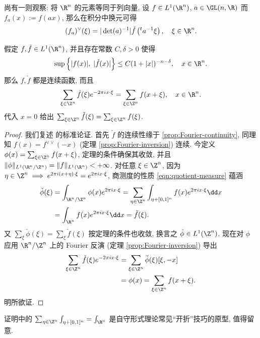 尚有一则观察: 将 $\R^n$ 的元素等同于列向量, 设 $f \in L^1(\R^n)$, $a \in \GL(n, \R)$ 而 $f_a(x) := f(ax)$, 那么在积分中换元可得
\begin{equation}\label{eqn:Fourier-dilation}
	(f_a)^\vee(\xi) = |\det(a)^{-1}| \check{f}\left({}^t a^{-1}\xi\right), \quad \xi \in \R^n.
\end{equation}

\begin{theorem}\label{prop:Poisson-sum} 
	假定 $f, \check{f} \in L^1(\R^n)$, 并且存在常数 $C, \delta > 0$ 使得
	\[ \sup\left\{ |f(x)|, \; |\check{f}(x)| \right\} \leq C(1 + |x|)^{-n-\delta}, \quad x \in \R^n. \]
	那么 $f, \check{f}$ 都是连续函数, 而且
	\[ \sum_{\xi \in \Z^n} \check{f}(\xi) e^{-2\pi ix \cdot \xi} = \sum_{\xi \in \Z^n} f(x + \xi), \quad x \in \R^n. \]
	代入 $x=0$ 给出 $\sum_{\xi \in \Z^n} \check{f}(\xi) = \sum_{\xi \in \Z^n} f(\xi)$.
\end{theorem}
\begin{proof}
	我们复述 \cite[Theorem 3.1.17]{Gra14} 的标准论证. 首先 $\check{f}$ 的连续性缘于 \ref{prop:Fourier-continuity}, 同理知 $f(x) = f^{\vee \vee}(-x)$ (定理 \ref{prop:Fourier-inversion}) 连续. 今定义 $\phi(x) = \sum_{\xi \in \Z^n} f(x+\xi)$, 定理的条件确保其收敛, 并且 $\|\phi\|_{L^1(\R^n/\Z^n)} = \|f\|_{L^1(\R^n)} < +\infty$. 对任意 $\xi \in \Z^n$, 因为 $\eta \in \Z^n \implies e^{2\pi i(x+\eta)\cdot\xi} = e^{2\pi ix \cdot \xi}$, 商测度的性质 \eqref{eqn:quotient-measure} 蕴涵
	\begin{align*}
		\check{\phi}(\xi) & = \int_{\R^n/\Z^n} \phi(x) e^{2\pi ix \cdot \xi} = \sum_{\eta \in \Z^n} \int_{\eta + [0,1]^n} f(x) e^{2\pi ix \cdot \xi} \dd x \\
		& = \int_{\R^n} f(x) e^{2\pi ix \cdot \xi} \dd x = \check{f}(\xi).
	\end{align*}
	又 $\sum_\xi \check{\phi}(\xi) = \sum_\xi \check{f}(\xi)$ 按定理的条件也收敛, 换言之 $\check{\phi} \in L^1(\Z^n)$. 现在对 $\phi$ 应用 $\R^n/\Z^n$ 上的 Fourier 反演 (定理 \ref{prop:Fourier-inversion}) 导出
	\begin{align*}
		\sum_{\xi \in \Z^n} \check{f}(\xi) e^{-2\pi ix \cdot \xi} & = \sum_{\xi \in \Z^n} \check{\phi}(\xi) [\xi, -x] \\
		& = \phi(x) = \sum_{\xi \in \Z^n} f(x + \xi).
	\end{align*}
	明所欲证.
\end{proof}

证明中的 $\sum_{\eta \in \Z^n} \int_{\eta + [0,1]^n} = \int_{\R^n}$ 是自守形式理论常见``开折''技巧的原型, 值得留意. 

